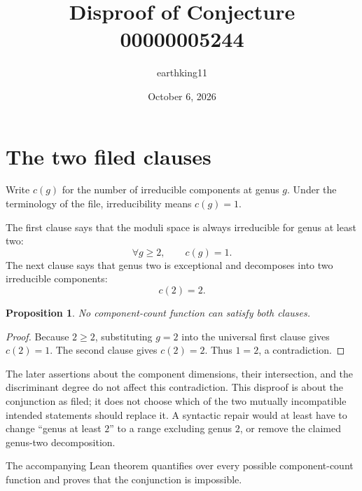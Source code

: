 \documentclass[11pt]{article}
\title{Disproof of Conjecture 00000005244}
\author{earthking11}
\date{October 6, 2026}
\newtheorem{proposition}{Proposition}
\begin{document}
\maketitle
\section*{The two filed clauses}
Write $c(g)$ for the number of irreducible components at genus $g$.  Under the
terminology of the file, irreducibility means $c(g)=1$.

The first clause says that the moduli space is always irreducible for genus at
least two:
\[
 \forall g\ge2,\qquad c(g)=1.
\]
The next clause says that genus two is exceptional and decomposes into two
irreducible components:
\[
 c(2)=2.
\]

\begin{proposition}
No component-count function can satisfy both clauses.
\end{proposition}
\begin{proof}
Because $2\ge2$, substituting $g=2$ into the universal first clause gives
$c(2)=1$.  The second clause gives $c(2)=2$.  Thus $1=2$, a contradiction.
\end{proof}

The later assertions about the component dimensions, their intersection, and
the discriminant degree do not affect this contradiction.  This disproof is
about the conjunction as filed; it does not choose which of the two mutually
incompatible intended statements should replace it.  A syntactic repair would
at least have to change ``genus at least $2$'' to a range excluding genus $2$,
or remove the claimed genus-two decomposition.

The accompanying Lean theorem quantifies over every possible component-count
function and proves that the conjunction is impossible.
\end{document}
